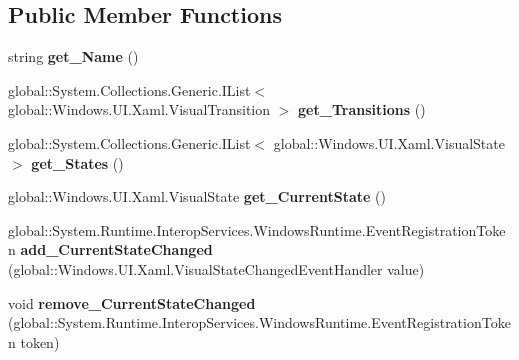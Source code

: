 \subsection*{Public Member Functions}
\begin{DoxyCompactItemize}
\item 
\mbox{\label{class_windows_1_1_u_i_1_1_xaml_1_1_visual_state_group_a2813cd015a01c964c6588672b185ac26}} 
string {\bfseries get\+\_\+\+Name} ()
\item 
\mbox{\label{class_windows_1_1_u_i_1_1_xaml_1_1_visual_state_group_a3738f82b20d960a14fdcfb568b232d49}} 
global\+::\+System.\+Collections.\+Generic.\+I\+List$<$ global\+::\+Windows.\+U\+I.\+Xaml.\+Visual\+Transition $>$ {\bfseries get\+\_\+\+Transitions} ()
\item 
\mbox{\label{class_windows_1_1_u_i_1_1_xaml_1_1_visual_state_group_a5f5c4abd2e95e2f7522780c26a7db8fd}} 
global\+::\+System.\+Collections.\+Generic.\+I\+List$<$ global\+::\+Windows.\+U\+I.\+Xaml.\+Visual\+State $>$ {\bfseries get\+\_\+\+States} ()
\item 
\mbox{\label{class_windows_1_1_u_i_1_1_xaml_1_1_visual_state_group_a74be4bea547bdf72e792a3c489cb7878}} 
global\+::\+Windows.\+U\+I.\+Xaml.\+Visual\+State {\bfseries get\+\_\+\+Current\+State} ()
\item 
\mbox{\label{class_windows_1_1_u_i_1_1_xaml_1_1_visual_state_group_ab8a602f85c6928ad4dbda31b0fc3d4fc}} 
global\+::\+System.\+Runtime.\+Interop\+Services.\+Windows\+Runtime.\+Event\+Registration\+Token {\bfseries add\+\_\+\+Current\+State\+Changed} (global\+::\+Windows.\+U\+I.\+Xaml.\+Visual\+State\+Changed\+Event\+Handler value)
\item 
\mbox{\label{class_windows_1_1_u_i_1_1_xaml_1_1_visual_state_group_a51b022e4c0673d691c79a0f52b0ca0af}} 
void {\bfseries remove\+\_\+\+Current\+State\+Changed} (global\+::\+System.\+Runtime.\+Interop\+Services.\+Windows\+Runtime.\+Event\+Registration\+Token token)
\item 

\end{DoxyCompactItemize}
